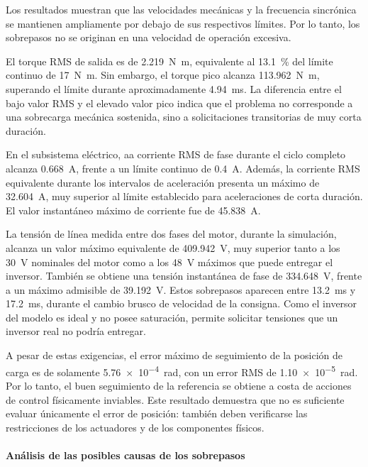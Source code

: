 \documentclass[10pt,a4paper]{article}
\begin{document}
Los resultados muestran que las velocidades mecánicas y la frecuencia sincrónica se
mantienen ampliamente por debajo de sus respectivos límites. Por lo tanto, los sobrepasos no se originan en una velocidad de operación excesiva.

El torque RMS de salida es de \SI{2.219}{\newton\metre}, equivalente al
\SI{13.1}{\percent} del límite continuo de \SI{17}{\newton\metre}. Sin embargo, el
torque pico alcanza \SI{113.962}{\newton\metre}, superando el límite durante aproximadamente
\SI{4.94}{\milli\second}. La diferencia entre el bajo valor RMS y el elevado valor
pico indica que el problema no corresponde a una sobrecarga mecánica sostenida, sino
a solicitaciones transitorias de muy corta duración.

En el subsistema eléctrico, aa corriente RMS de
fase durante el ciclo completo alcanza \SI{0.668}{\ampere}, frente a un límite continuo
de \SI{0.4}{\ampere}. Además, la corriente RMS equivalente durante los intervalos de
aceleración presenta un máximo de \SI{32.604}{\ampere}, muy superior al límite establecido para aceleraciones de corta duración. El valor instantáneo
máximo de corriente fue de \SI{45.838}{\ampere}.

La tensión de línea  medida entre dos fases del motor, durante la simulación, alcanza un valor máximo equivalente de \SI{409.942}{V}, muy superior tanto a los \SI{30}{V} nominales del motor como a los \SI{48}{V} máximos que puede entregar el inversor. También se obtiene una tensión instantánea de fase de \SI{334.648}{V}, frente a un máximo admisible de \SI{39.192}{V}. Estos sobrepasos aparecen entre \SI{13.2}{ms} y \SI{17.2}{ms}, durante el cambio brusco de velocidad de la consigna. Como el inversor del modelo es ideal y no posee saturación, permite solicitar tensiones que un inversor real no podría entregar.

A pesar de estas exigencias, el error máximo de seguimiento de la posición de carga es
de solamente \SI{5.76e-4}{\radian}, con un error RMS de
\SI{1.10e-5}{\radian}. Por lo tanto, el buen seguimiento de la referencia se obtiene a
costa de acciones de control físicamente inviables. Este resultado demuestra que no es
suficiente evaluar únicamente el error de posición: también deben verificarse las
restricciones de los actuadores y de los componentes físicos.

\paragraph{Análisis de las posibles causas de los sobrepasos}
\label{sec:causas_sobrepasos_4a}
\end{document}

